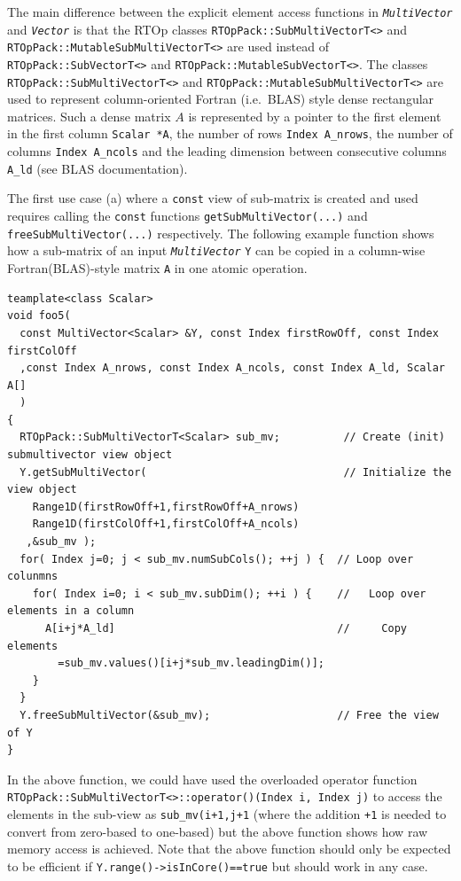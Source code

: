 The main difference between the explicit element access functions in
{}\texttt{\textit{Multi\-Vector}} and {}\texttt{\textit{Vector}} is
that the RTOp classes {}\texttt{RTOpPack::\-Sub\-Multi\-Vector\-T<>}
and {}\texttt{RTOpPack::\-Mutable\-Sub\-Multi\-Vector\-T<>} are used
instead of {}\texttt{RTOpPack::\-Sub\-Vector\-T<>} and
{}\texttt{RTOpPack::\-Mutable\-Sub\-Vector\-T<>}.  The classes
{}\texttt{RTOpPack::\-Sub\-Multi\-Vector\-T<>} and
{}\texttt{RTOpPack::\-Mutable\-Sub\-Multi\-Vector\-T<>} are used to
represent column-oriented Fortran (i.e.~BLAS) style dense rectangular
matrices.  Such a dense matrix $A$ is represented by a pointer to the
first element in the first column {}\texttt{Scalar *A}, the number of
rows {}\texttt{Index A\_nrows}, the number of columns {}\texttt{Index
A\_ncols} and the leading dimension between consecutive columns
{}\texttt{A\_ld} (see BLAS documentation).

The first use case (a) where a {}\texttt{const} view of sub-matrix is
created and used requires calling the {}\texttt{const} functions
{}\texttt{get\-Sub\-Multi\-Vector(...)} and
{}\texttt{free\-Sub\-Multi\-Vector(...)}  respectively.  The following
example function shows how a sub-matrix of an input
{}\texttt{\textit{Multi\-Vector}} {}\texttt{Y} can be copied in a
column-wise Fortran(BLAS)-style matrix {}\texttt{A} in one atomic
operation.

{\scriptsize\begin{verbatim}
teamplate<class Scalar>
void foo5(
  const MultiVector<Scalar> &Y, const Index firstRowOff, const Index firstColOff
  ,const Index A_nrows, const Index A_ncols, const Index A_ld, Scalar A[]
  )
{
  RTOpPack::SubMultiVectorT<Scalar> sub_mv;          // Create (init) submultivector view object
  Y.getSubMultiVector(                               // Initialize the view object
    Range1D(firstRowOff+1,firstRowOff+A_nrows)
    Range1D(firstColOff+1,firstColOff+A_ncols)
   ,&sub_mv );
  for( Index j=0; j < sub_mv.numSubCols(); ++j ) {  // Loop over colunmns
    for( Index i=0; i < sub_mv.subDim(); ++i ) {    //   Loop over elements in a column
      A[i+j*A_ld]                                   //     Copy elements
        =sub_mv.values()[i+j*sub_mv.leadingDim()];
    }
  }
  Y.freeSubMultiVector(&sub_mv);                    // Free the view of Y
}
\end{verbatim}}

In the above function, we could have used the overloaded operator
function
{}\texttt{RTOpPack::\-Sub\-Multi\-VectorT<>::\-operator()(Index i,
Index j)} to access the elements in the sub-view as
{}\texttt{sub\_mv(i+1,j+1} (where the addition {}\texttt{+1} is needed
to convert from zero-based to one-based) but the above function shows
how raw memory access is achieved.  Note that the above function
should only be expected to be efficient if
{}\texttt{Y.range()->isInCore()==true} but should work in any case.


